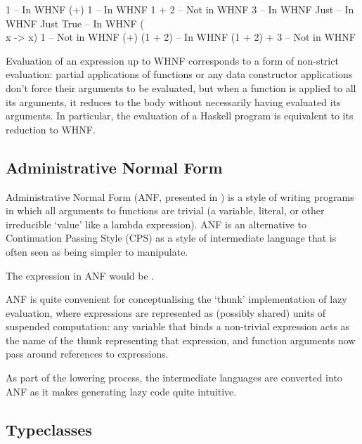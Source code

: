 \documentclass[dissertation.tex]{subfiles}
\begin{document}
{{        \begin{haskellfigure}
        1               -- In WHNF
        (+) 1           -- In WHNF
        1 + 2           -- Not in WHNF
        3               -- In WHNF
        Just            -- In WHNF
        Just True       -- In WHNF
        (\\x -> x) 1    -- Not in WHNF
        (+) (1 + 2)     -- In WHNF
        (1 + 2) + 3     -- Not in WHNF
        \end{haskellfigure}

        Evaluation of an expression up to WHNF corresponds to a form of non-strict evaluation: partial applications of
        functions or any data constructor applications don't force their arguments to be evaluated, but when a function
        is applied to all its arguments, it reduces to the body without necessarily having evaluated its arguments. In
        particular, the evaluation of a Haskell program is equivalent to its reduction to WHNF.

    }
    \subsection{Administrative Normal Form}\label{sec:anf}
    {

        Administrative Normal Form (ANF, presented in \cite{ANF}) is a style of writing programs in which all arguments
        to functions are trivial (a variable, literal, or other irreducible `value' like a lambda expression). ANF is an
        alternative to Continuation Passing Style (CPS) as a style of intermediate language that is often seen as being
        simpler to manipulate.

        The expression  in ANF would be .

        ANF is quite convenient for conceptualising the `thunk' implementation of lazy evaluation, where expressions are
        represented as (possibly shared) units of suspended computation: any variable that binds a non-trivial
        expression acts as the name of the thunk representing that expression, and function arguments now pass around
        references to expressions.

        As part of the lowering process, the intermediate languages are converted into ANF as it makes generating lazy
        code quite intuitive.

    }
    \subsection{Typeclasses}\label{sec:typeclasses}
    {

}}
\end{document}
